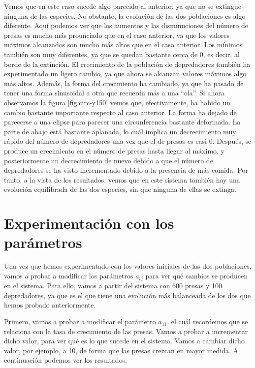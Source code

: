 \documentclass[11pt,a4paper]{article}
\begin{document}
Vemos que en este caso sucede algo parecido al anterior, ya que no se extingue ninguna de las especies.
No obstante, la evolución de las dos poblaciones es algo diferente. Aquí podemos ver que los aumentos
y las disminuciones del número de presas es mucho más prounciado que en el caso anterior, ya que los
valores máximos alcanzados son mucho más altos que en el caso anterior. Los mínimos también son muy diferentes,
ya que se quedan bastante cerca de 0, es decir, al borde de la extinción. El crecimiento de la población
de depredadores también ha experimentado un ligero cambio, ya que ahora se alcanzan valores máximos algo
más altos. Además, la forma del crecimiento ha cambiado, ya que ha pasado de tener una forma sinusoidal a otra
que recuerda más a una ``ola''. Si ahora observamos la figura \ref{fig:circ-y150} vemos que, efectivamente, ha
habido un cambio bastante importante respecto al caso anterior. La forma ha dejado de parecerse a una elipse para
parecer una circunferencia bastante deformada. La parte de abajo está bastante aplanada, lo cuál implica
un decrecimiento muy rápido del número de depredadores una vez que el de presas es casi 0. Después, se produce
un crecimiento en el número de presas hasta llegar al máximo, y posteriormente un decrecimiento de nuevo debido
a que el número de depredadores se ha visto incrementado debido a la presencia de más comida. Por tanto, a la vista
de los resultados, vemos que en este sistema también hay una evolución equilibrada de las dos especies, sin que
ninguna de ellas se extinga.

\section{Experimentación con los parámetros}

Una vez que hemos experimentado con los valores iniciales de las dos poblaciones, vamos
a probar a modificar los parámetros $a_{ij}$ para ver qué cambios se producen en el sistema.
Para ello, vamos a partir del sistema con 600 presas y 100 depredadores, ya que es el que tiene
una evolución más balanceada de los dos que hemos probado anteriormente.

Primero, vamos a probar a modificar el parámetro $a_{11}$, el cuál recordemos que se
relaciona con la tasa de crecimiento de las presas. Vamos a probar a incrementar dicho
valor, para ver qué es lo que sucede en el sistema. Vamos a cambiar dicho valor, por ejemplo,
a 10, de forma que las presas crezcan en mayor medida. A continuación podemos ver los resultados:
\end{document}
